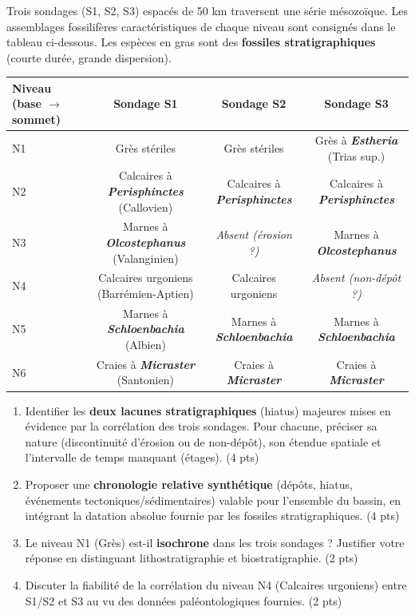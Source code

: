 \documentclass[11pt]{article}
\begin{document}
\begin{exercice}
Trois sondages (S1, S2, S3) espacés de 50 km traversent une série mésozoïque. Les assemblages fossilifères caractéristiques de chaque niveau sont consignés dans le tableau ci-dessous. Les espèces en gras sont des \textbf{fossiles stratigraphiques} (courte durée, grande dispersion).

\begin{tabular}{|l|c|c|c|}
\hline
\textbf{Niveau (base $\to$ sommet)} & \textbf{Sondage S1} & \textbf{Sondage S2} & \textbf{Sondage S3} \\
\hline
N1 & Grès stériles & Grès stériles & Grès à \textbf{\textit{Estheria}} (Trias sup.) \\
\hline
N2 & Calcaires à \textbf{\textit{Perisphinctes}} (Callovien) & Calcaires à \textbf{\textit{Perisphinctes}} & Calcaires à \textbf{\textit{Perisphinctes}} \\
\hline
N3 & Marnes à \textbf{\textit{Olcostephanus}} (Valanginien) & \textit{Absent (érosion ?)} & Marnes à \textbf{\textit{Olcostephanus}} \\
\hline
N4 & Calcaires urgoniens (Barrémien-Aptien) & Calcaires urgoniens & \textit{Absent (non-dépôt ?)} \\
\hline
N5 & Marnes à \textbf{\textit{Schloenbachia}} (Albien) & Marnes à \textbf{\textit{Schloenbachia}} & Marnes à \textbf{\textit{Schloenbachia}} \\
\hline
N6 & Craies à \textbf{\textit{Micraster}} (Santonien) & Craies à \textbf{\textit{Micraster}} & Craies à \textbf{\textit{Micraster}} \\
\hline
\end{tabular}

\begin{enumerate}
\item Identifier les \textbf{deux lacunes stratigraphiques} (hiatus) majeures mises en évidence par la corrélation des trois sondages. Pour chacune, préciser sa nature (discontinuité d'érosion ou de non-dépôt), son étendue spatiale et l'intervalle de temps manquant (étages). \hfill (4 pts)
\item Proposer une \textbf{chronologie relative synthétique} (dépôts, hiatus, événements tectoniques/sédimentaires) valable pour l'ensemble du bassin, en intégrant la datation absolue fournie par les fossiles stratigraphiques. \hfill (4 pts)
\item Le niveau N1 (Grès) est-il \textbf{isochrone} dans les trois sondages ? Justifier votre réponse en distinguant lithostratigraphie et biostratigraphie. \hfill (2 pts)
\item Discuter la fiabilité de la corrélation du niveau N4 (Calcaires urgoniens) entre S1/S2 et S3 au vu des données paléontologiques fournies. \hfill (2 pts)
\end{enumerate}
\end{exercice}
\end{document}
